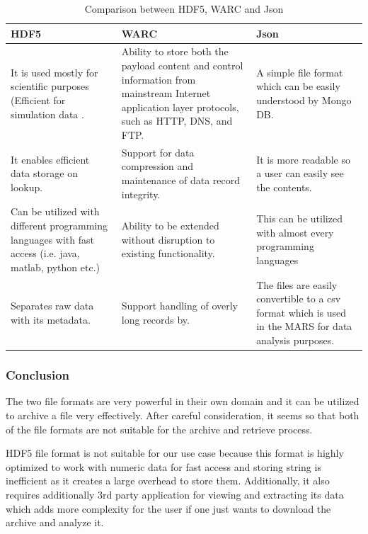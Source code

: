  \begin{table}[H]
    \centering
    \begin{tabular}{|p{4.6cm}|p{4.6cm}|p{4.6cm}|}
        \hline
            \textbf{HDF5}  & \textbf{WARC}&\textbf{Json}\\
        \hline
            It is used mostly for scientific purposes (Efficient
            for simulation data \cite[p.~11]{Savic2007}. & 
            Ability to store both the payload content and control information from mainstream Internet application layer protocols, such as
            HTTP, DNS, and FTP. & A simple file format which can be easily understood by Mongo DB.\\
        \hline
            It enables efficient data storage on lookup.
            &  
            Support for data compression and maintenance of
             data record integrity. & It is more readable so a user can easily see the contents.\\
        \hline
        Can be utilized with different programming languages with fast access (i.e. java, matlab, python etc.) &  
                Ability to be extended without disruption
                to existing functionality. & This can be utilized with almost every programming languages\\
        \hline
        Separates raw data with its metadata. & Support handling of overly long records by.& The files are easily convertible to a csv format which is used in the MARS
        for data analysis purposes. \\        
        \hline
    \end{tabular}
    \caption{Comparison between HDF5, WARC and Json}
    \label{table:Hdf5vsWARC}     
\end{table} 

\subsubsection{Conclusion}
    The two file formats are very powerful in their own domain and it can be utilized to archive a file very effectively. After careful consideration,  
    it seems so that both of the file formats are not suitable for the archive and retrieve process. 

    HDF5 file format is not suitable for our use case because this format is highly optimized to work with
    numeric data for fast access and storing string is inefficient as it creates a large overhead to store them. 
    Additionally, it also requires additionally 3rd party application for viewing and extracting its data which 
    adds more complexity for the user if one just wants to download the archive and analyze it. 

